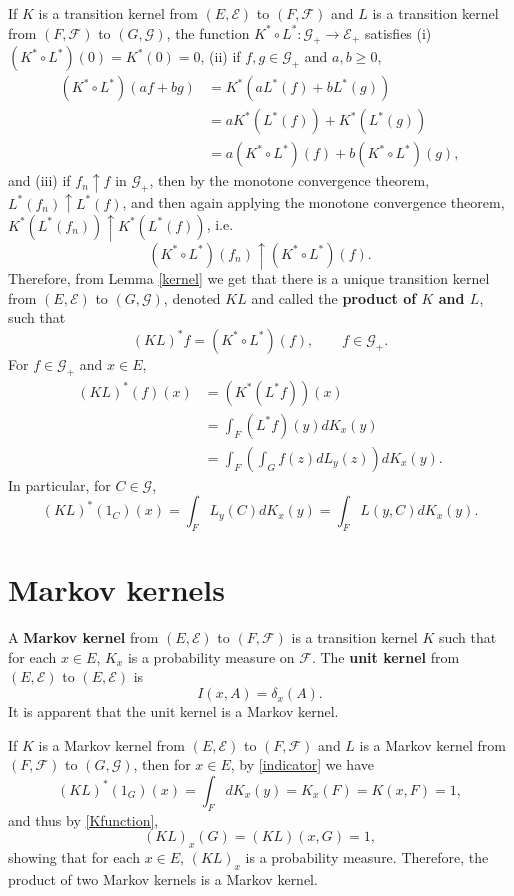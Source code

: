 \documentclass{article}
\theoremstyle{definition}
\theoremstyle{definition}
\begin{document}
If $K$ is a transition kernel from $(E,\mathscr{E})$ to $(F,\mathscr{F})$ and
$L$ is a transition kernel from
$(F,\mathscr{F})$ to $(G,\mathscr{G})$, 
the function $K^* \circ L^*:\mathscr{G}_+ \to \mathscr{E}_+$ satisfies 
(i) $(K^* \circ L^*)(0)=K^*(0)=0$,
(ii) if $f,g \in \mathscr{G}_+$ and $a,b \geq 0$,
\begin{align*}
(K^* \circ L^*)(af+bg) &= K^*(aL^*(f)+bL^*(g))\\
&= aK^*(L^*(f))+K^*(L^*(g))\\
&=a(K^* \circ L^*)(f)+b(K^* \circ L^*)(g),
\end{align*}
and (iii) if $f_n \uparrow f$ in $\mathscr{G}_+$,
then by the monotone convergence theorem, $L^*(f_n) \uparrow L^*(f)$, and then
again applying the monotone convergence theorem, $K^*(L^*(f_n)) \uparrow K^*(L^*(f))$,
i.e. 
\[
(K^* \circ L^*)(f_n) \uparrow (K^* \circ L^*)(f).
\]
Therefore, from Lemma \ref{kernel} we get that there is a unique transition kernel
from $(E,\mathscr{E})$ to $(G,\mathscr{G})$,
denoted $KL$ and called the \textbf{product of $K$ and $L$},
 such that
\[
(KL)^* f  = (K^* \circ L^*)(f), \qquad f \in \mathscr{G}_+.
\]
For $f \in \mathscr{G}_+$ and $x \in E$,
\begin{align*}
(KL)^*(f)(x)&=(K^*(L^* f))(x)\\
&=\int_F (L^*f)(y) dK_x(y)\\
&=\int_F \left( \int_G f(z) dL_y(z) \right) dK_x(y).
\end{align*}
In particular, for $C \in \mathscr{G}$,
\begin{equation}
(KL)^*(1_C)(x) = \int_F L_y(C) dK_x(y)
=\int_F L(y,C) dK_x(y).
\label{indicator}
\end{equation}


\section{Markov kernels}
A \textbf{Markov kernel} from $(E,\mathscr{E})$ to $(F,\mathscr{F})$ is a transition kernel $K$ such that
for each $x \in E$, $K_x$ is a probability measure on $\mathscr{F}$. 
The \textbf{unit kernel} from $(E,\mathscr{E})$ to $(E,\mathscr{E})$ is
\begin{equation}
I(x,A) = \delta_x(A).
\label{unitkernel}
\end{equation}
It is apparent that the unit kernel is a Markov kernel.

If $K$ is a Markov kernel from $(E,\mathscr{E})$ to $(F,\mathscr{F})$ and
$L$ is a Markov kernel from
$(F,\mathscr{F})$ to $(G,\mathscr{G})$, then
for $x \in E$, by \eqref{indicator} we have
\[
(KL)^*(1_G)(x) = \int_F dK_x(y) = K_x(F) = K(x,F) = 1,
\]
and thus by \eqref{Kfunction},
\[
(KL)_x(G) = (KL)(x,G) = 1,
\]
showing that for each $x \in E$, $(KL)_x$ is a probability measure. Therefore,
the product of two Markov kernels is a Markov kernel.
\end{document}
